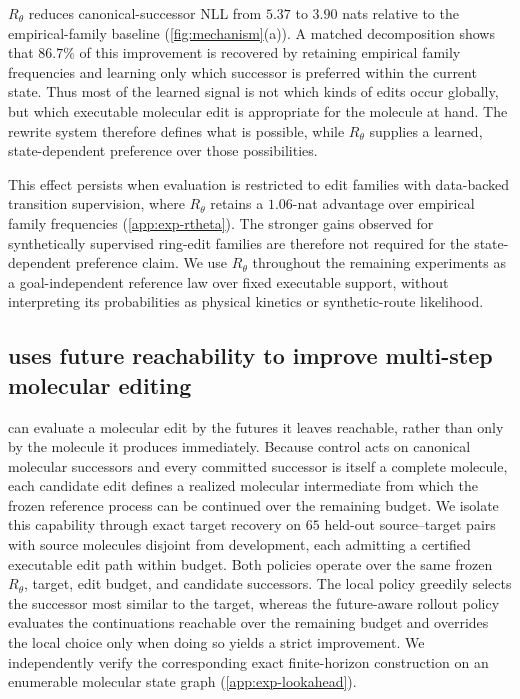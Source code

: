 $R_\theta$ reduces canonical-successor NLL from $5.37$ to $3.90$ nats relative to the empirical-family baseline (\cref{fig:mechanism}(a)). A matched decomposition shows that $86.7\%$ of this improvement is recovered by retaining empirical family frequencies and learning only which successor is preferred within the current state. Thus most of the learned signal is not which kinds of edits occur globally, but which executable molecular edit is appropriate for the molecule at hand. The rewrite system therefore defines what is possible, while $R_\theta$ supplies a learned, state-dependent preference over those possibilities.

This effect persists when evaluation is restricted to edit families with data-backed transition supervision, where $R_\theta$ retains a $1.06$-nat advantage over empirical family frequencies (\cref{app:exp-rtheta}). The stronger gains observed for synthetically supervised ring-edit families are therefore not required for the state-dependent preference claim. We use $R_\theta$ throughout the remaining experiments as a goal-independent reference law over fixed executable support, without interpreting its probabilities as physical kinetics or synthetic-route likelihood.

\subsection{\method{} uses future reachability to improve multi-step molecular editing}
\label{sec:exp-lookahead}

\method{} can evaluate a molecular edit by the futures it leaves reachable, rather than only by the molecule it produces immediately. Because control acts on canonical molecular successors and every committed successor is itself a complete molecule, each candidate edit defines a realized molecular intermediate from which the frozen reference process can be continued over the remaining budget. We isolate this capability through exact target recovery on $65$ held-out source--target pairs with source molecules disjoint from development, each admitting a certified executable edit path within budget. Both policies operate over the same frozen $R_\theta$, target, edit budget, and candidate successors. The local policy greedily selects the successor most similar to the target, whereas the future-aware rollout policy evaluates the continuations reachable over the remaining budget and overrides the local choice only when doing so yields a strict improvement. We independently verify the corresponding exact finite-horizon construction on an enumerable molecular state graph (\cref{app:exp-lookahead}).

